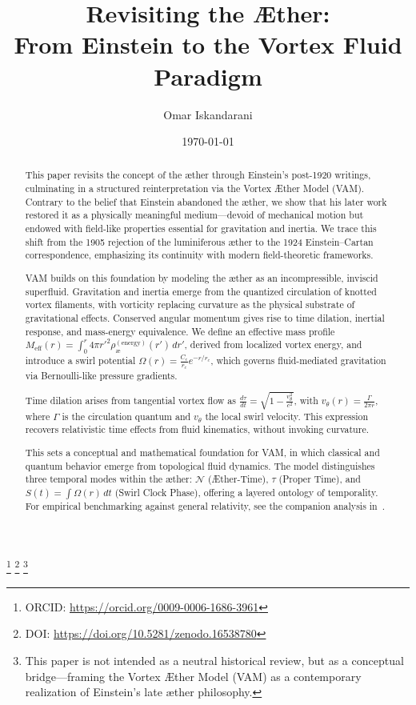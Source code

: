 \documentclass[preprint,notitlepage]{revtex4-2}
\begin{document}
    \title{Revisiting the Æther:\\ From Einstein to the Vortex Fluid Paradigm}

    \author{Omar Iskandarani}
    \thanks{ORCID: \url{https://orcid.org/0009-0006-1686-3961}}
    \thanks{DOI: \url{https://doi.org/10.5281/zenodo.16538780}}
    \thanks{This paper is not intended as a neutral historical review, but as a conceptual bridge—framing the Vortex Æther Model (VAM) as a contemporary realization of Einstein’s late æther philosophy.}

    \date{\today}


    \vspace{1em}

    \begin{abstract}
    This paper revisits the concept of the æther through Einstein’s post-1920 writings, culminating in a structured reinterpretation via the Vortex Æther Model (VAM). Contrary to the belief that Einstein abandoned the æther, we show that his later work restored it as a physically meaningful medium—devoid of mechanical motion but endowed with field-like properties essential for gravitation and inertia. We trace this shift from the 1905 rejection of the luminiferous æther to the 1924 Einstein–Cartan correspondence, emphasizing its continuity with modern field-theoretic frameworks.

    VAM builds on this foundation by modeling the æther as an incompressible, inviscid superfluid. Gravitation and inertia emerge from the quantized circulation of knotted vortex filaments, with vorticity replacing curvature as the physical substrate of gravitational effects. Conserved angular momentum gives rise to time dilation, inertial response, and mass-energy equivalence. We define an effective mass profile \( M_{\text{eff}}(r) = \int_0^r 4\pi r'^2 \rho_\text{\ae}^{(\text{energy})}(r') \, dr' \), derived from localized vortex energy, and introduce a swirl potential \( \Omega(r) = \frac{C_e}{r_c} e^{-r/r_c} \), which governs fluid-mediated gravitation via Bernoulli-like pressure gradients.

    Time dilation arises from tangential vortex flow as \( \frac{d\tau}{dt} = \sqrt{1 - \frac{v_\theta^2}{c^2}} \), with \( v_\theta(r) = \frac{\Gamma}{2\pi r} \), where \( \Gamma \) is the circulation quantum and \( v_\theta \) the local swirl velocity. This expression recovers relativistic time effects from fluid kinematics, without invoking curvature.

    This sets a conceptual and mathematical foundation for VAM, in which classical and quantum behavior emerge from topological fluid dynamics. The model distinguishes three temporal modes within the æther: \( \mathcal{N} \) (Æther-Time), \( \tau \) (Proper Time), and \( S(t) = \int \Omega(r)\, dt \) (Swirl Clock Phase), offering a layered ontology of temporality. For empirical benchmarking against general relativity, see the companion analysis in~\cite{VAM-3}.
    \end{abstract}
   \maketitle
\end{document}
